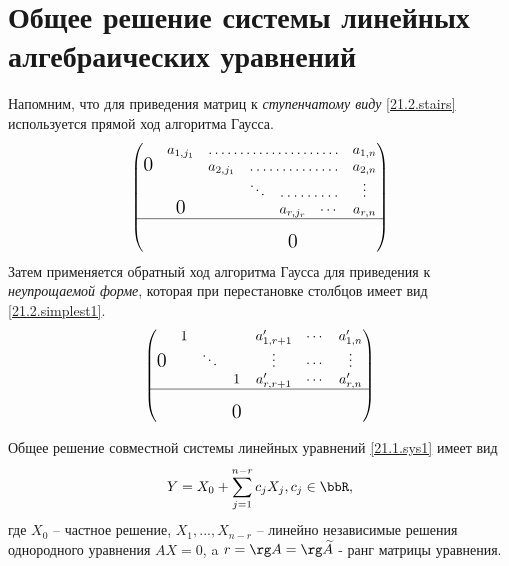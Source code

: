 \section{Общее решение системы линейных алгебраических уравнений}
  Напомним, что для приведения матриц к \textit{ступенчатому виду} \ref{21.2.stairs} используется прямой ход алгоритма Гаусса. 
  \begin{equation}\label{21.2.stairs} 
  \begin{pmatrix}
      &a_{1,j_1}& \hdotsfor{4}          &a_{1,n}     \cr 
 \fudge 0&&a_{2,j_1} &\hdotsfor{3}      &a_{2,n}     \cr
      &   &     &\ddots&\hdotsfor{2}    &\vdots      \cr 
      &\fudge 0 && & a_{r,j_r}  &\cdots &a_{r,n}   \cr \hline
      &   &     &  &            &       &         \cr
      &   &     &  &\fudge 0    &       &         \cr
  \end{pmatrix}
  \end{equation}    
  Затем применяется обратный ход алгоритма Гаусса для приведения к \textit{неупрощаемой форме}, которая при перестановке столбцов имеет вид \ref{21.2.simplest1}.
  \begin{equation}\label{21.2.simplest1}
  \begin{pmatrix}
      & 1 &     &   &a'_{1,r+1} &\cdots &a'_{1,n}   \cr 
    \smash{\hbox{\Large0}} & &\ddots& &\vdots &\cdots &\vdots     \cr
      &   &     & 1 &a'_{r,r+1} &\cdots &a'_{r,n}   \cr \hline
      &   &     &   &           &       &           \cr
      &   & &\smash{\hbox{\Large0}}  &        &       &           \cr
  \end{pmatrix}
  \end{equation}    
  \begin{thm} 
  Общее решение совместной системы линейных уравнений \ref{21.1.sys1} имеет вид 
  \begin{equation}\label{21.2.common}
   Y=X_0+\sum_{j=1}^{n-r}c_jX_j, c_j \in \bbR,
  \end{equation}
  где $X_0$ -- частное решение, $X_1,...,X_{n-r}$ -- линейно независимые решения однородного уравнения $AX=0$, a $r=\rg A=\rg \widetilde A$ - ранг матрицы уравнения.
  \end{thm}
